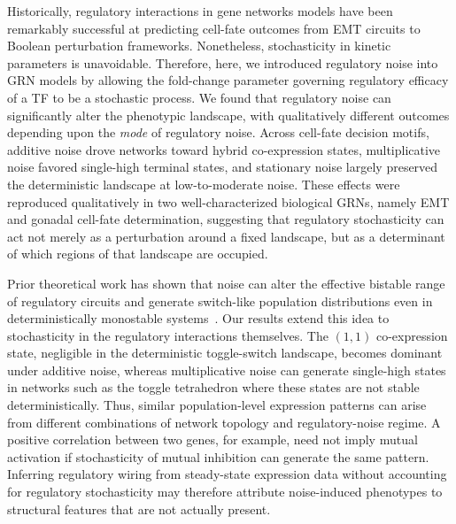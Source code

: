 \documentclass[11pt]{article}
\begin{document}
Historically, regulatory interactions in gene networks models have been remarkably successful at predicting cell-fate outcomes from EMT circuits to Boolean perturbation frameworks. Nonetheless, stochasticity in kinetic parameters is unavoidable. Therefore, here, we introduced regulatory noise into GRN models by allowing the fold-change parameter governing regulatory efficacy of a TF to be a stochastic process. We found that regulatory noise can significantly alter the phenotypic landscape, with qualitatively different outcomes depending upon the \emph{mode} of regulatory noise. Across cell-fate decision motifs, additive noise drove networks toward hybrid co-expression states, multiplicative noise favored single-high terminal states, and stationary noise largely preserved the deterministic landscape at low-to-moderate noise. These effects were reproduced qualitatively in two well-characterized biological GRNs, namely EMT and gonadal cell-fate determination, suggesting that regulatory stochasticity can act not merely as a perturbation around a fixed landscape, but as a determinant of which regions of that landscape are occupied.

Prior theoretical work has shown that noise can alter the effective bistable range of regulatory circuits and generate switch-like population distributions even in deterministically monostable systems~\cite{OchabMarcinek2010w}. Our results extend this idea to stochasticity in the regulatory interactions themselves. The $(1, 1)$ co-expression state, negligible in the deterministic toggle-switch landscape, becomes dominant under additive noise, whereas multiplicative noise can generate single-high states in networks such as the toggle tetrahedron where these states are not stable deterministically. Thus, similar population-level expression patterns can arise from different combinations of network topology and regulatory-noise regime. A positive correlation between two genes, for example, need not imply mutual activation if stochasticity of mutual inhibition can generate the same pattern. Inferring regulatory wiring from steady-state expression data without accounting for regulatory stochasticity may therefore attribute noise-induced phenotypes to structural features that are not actually present.
\end{document}

